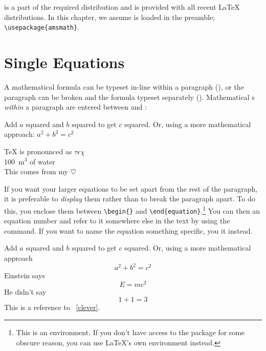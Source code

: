  is a part of the required distribution and is provided
with all recent \LaTeX{} distributions. In this chapter, we assume
 is loaded in the preamble; \verb|\usepackage{amsmath}|.

\section{Single Equations}

A mathematical formula can be typeset in-line within a paragraph (\emph{}), or the paragraph can be broken and the formula typeset separately
(\emph{}). Mathematical s
\emph{within} a paragraph are entered
between \ai{\$} and \ai{\$}:
\begin{example}
Add $a$ squared and $b$ squared
to get $c$ squared. Or, using 
a more mathematical approach:
$a^2 + b^2 = c^2$
\end{example}
\begin{example}
\TeX{} is pronounced as 
$\tau\epsilon\chi$\\[5pt]
100~m$^{3}$ of water\\[5pt]
This comes from my $\heartsuit$
\end{example}

If you want your larger equations to be set apart
from the rest of the paragraph, it is preferable to \emph{display} them
rather than to break the paragraph apart.
To do this, you enclose them between \verb|\begin{|\verb|}| and
\verb|\end{equation}|.\footnote{This is an  environment. If you don't
  have access to the package for some obscure reason, you can use \LaTeX's own
   environment instead.} You can then  an equation number and refer to
it somewhere else in the text by using the  command. If you want to
name the equation something specific, you  it instead.
\begin{example}
Add $a$ squared and $b$ squared
to get $c$ squared. Or, using
a more mathematical approach
 \begin{equation}
   a^2 + b^2 = c^2
 \end{equation}
Einstein says
 \begin{equation}
   E = mc^2 \label{clever}
 \end{equation}
He didn't say
 \begin{equation}
  1 + 1 = 3 \tag{dumb}
 \end{equation}
This is a reference to%
~\eqref{clever}. 
\end{example}

